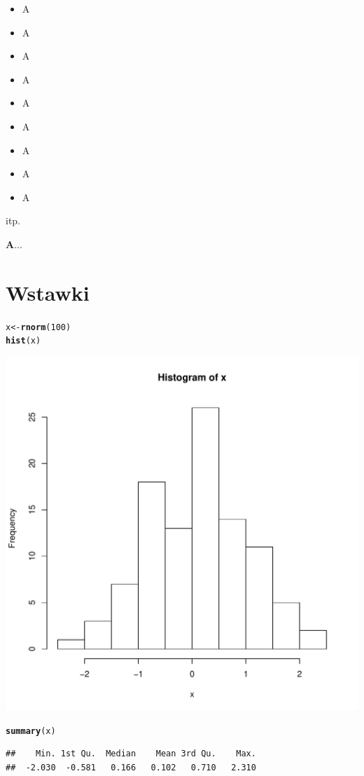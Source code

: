 \documentclass[12pt]{article}\usepackage[]{graphicx}\usepackage[]{color}
\makeatletter
\def\maxwidth{ %
  \ifdim\Gin@nat@width>\linewidth
    \linewidth
  \else
    \Gin@nat@width
  \fi
}
\newcommand{\hlnum}[1]{\textcolor[rgb]{0.686,0.059,0.569}{#1}}%
\newcommand{\hlstd}[1]{\textcolor[rgb]{0.345,0.345,0.345}{#1}}%
\newcommand{\hlkwb}[1]{\textcolor[rgb]{0.69,0.353,0.396}{#1}}%
\newcommand{\hlkwd}[1]{\textcolor[rgb]{0.737,0.353,0.396}{\textbf{#1}}}%
\newenvironment{kframe}{%
 \def\at@end@of@kframe{}%
 \ifinner\ifhmode%
  \def\at@end@of@kframe{\end{minipage}}%
  \begin{minipage}{\columnwidth}%
 \fi\fi%
 \def\FrameCommand##1{\hskip\@totalleftmargin \hskip-\fboxsep
 \colorbox{shadecolor}{##1}\hskip-\fboxsep
     \hskip-\linewidth \hskip-\@totalleftmargin \hskip\columnwidth}%
 \MakeFramed {\advance\hsize-\width
   \@totalleftmargin\z@ \linewidth\hsize
   \@setminipage}}%
 {\par\unskip\endMakeFramed%
 \at@end@of@kframe}
\newenvironment{knitrout}{}{} %
\makeatother
\begin{document}
\begin{itemize}
\item A
\item \tiny A
\item \scriptsize A
\item \small A
\item \large A
\item \Large A
\item \LARGE A
\item \huge A
\item \Huge A
\end{itemize}
itp.

\textbf{A}...

\section{Wstawki}

\begin{knitrout}
\color{fgcolor}\begin{kframe}
\begin{alltt}
\hlstd{x} \hlkwb{<-} \hlkwd{rnorm}\hlstd{(}\hlnum{100}\hlstd{)}
\hlkwd{hist}\hlstd{(x)}
\end{alltt}
\end{kframe}
\includegraphics[width=\maxwidth]{figure/unnamed-chunk-1} 
\begin{kframe}\begin{alltt}
\hlkwd{summary}\hlstd{(x)}
\end{alltt}
\begin{verbatim}
##    Min. 1st Qu.  Median    Mean 3rd Qu.    Max. 
##  -2.030  -0.581   0.166   0.102   0.710   2.310
\end{verbatim}
\end{kframe}
\end{knitrout}
\end{document}
